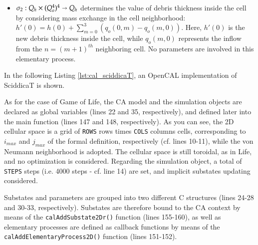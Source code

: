 \begin{itemize}
\begin{itemize}

\item $\sigma_2: Q_h \times (Q_o^4)^4 \shortrightarrow Q_h$ determines
  the value of debris thickness inside the cell by considering mass
  exchange in the cell neighborhood: $h'(0) = h(0) + \sum_{m=0}^3
  (q_o(0,m) - q_o(m,0))$. Here, $h'(0)$ is the new debris
  thickness inside the cell, while $q_o(m,0)$ represents the inflow from
  the $n=(m+1)^{th}$ neighboring cell. No parameters are involved in
  this elementary process.

\end{itemize}
\end{itemize}

In the following Listing \ref{lst:cal_sciddicaT}, an OpenCAL
implementation of SciddicaT is shown.



As for the case of Game of Life, the CA model and the simulation
objects are declared as global variables (lines 22 and 35,
respectively), and defined later into the main function (lines 147 and
148, respectively). As you can see, the 2D cellular space is a grid
of \verb'ROWS' rows times \verb'COLS' columns cells, corresponding to
$i_{max}$ and $j_{max}$ of the formal definition, respectively
(cf. lines 10-11), while the von Neumann neighborhood is adopted. The
cellular space is still toroidal, as in Life, and no optimization is
considered. Regarding the simulation object, a total of \verb'STEPS'
steps (i.e. 4000 steps - cf. line 14) are set, and implicit substates
updating considered.

Substates and parameters are grouped into two different C structures
(lines 24-28 and 30-33, respectively). Substates are therefore bound to
the CA context by means of the \verb'calAddSubstate2Dr()' function
(lines 155-160), as well as elementary processes are defined as
callback functions by means of the \verb'calAddElementaryProcess2D()'
function (lines 151-152).

